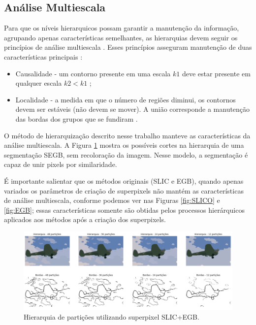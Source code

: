 \begin{document}

\subsection{Análise Multiescala} \label{ssec:analise_multiescala}

Para que os níveis hierarquicos possam garantir a manutenção da informação, agrupando apenas características semelhantes, as hierarquias devem seguir os princípios de análise multiescala \cite{SILVIO_ZENILTON}. Esses princípios asseguram manutenção de duas características principais \cite{SILVIO_ZENILTON}:

\begin{itemize}
 \item Causalidade - um contorno presente em uma escala $k1$ deve estar presente em qualquer escala $k2 < k1$ \cite{SILVIO_ZENILTON};
 \item Localidade - a medida em que o número de regiões diminui, os contornos devem ser estáveis (não devem se mover). A união corresponde a manutenção das bordas dos grupos que se fundiram \cite{SILVIO_ZENILTON}.
\end{itemize}

O método de hierarquização descrito nesse trabalho manteve as características da análise multiescala. A Figura \ref{fig:hierarq_partit} mostra os possíveis cortes na hierarquia de uma segmentação SEGB, sem recoloração da imagem. Nesse modelo, a segmentação é capaz de unir pixels por similaridade.

É importante salientar que os métodos originais (SLIC e EGB), quando apenas variados os parâmetros de criação de superpixels não mantém as características de análise multiescala, conforme podemos ver nas Figuras \ref{fig:SLICO} e \ref{fig:EGB}; essas características somente são obtidas pelos processos hierárquicos aplicados aos métodos após a criação dos superpixels.

\begin{figure}[ht]
\centering
\includegraphics[width=1.\textwidth]{slic_hierarquia_particoes.png}
\caption{Hierarquia de partições utilizando superpixel SLIC+EGB.}
\label{fig:hierarq_partit}
\end{figure}
\end{document}
